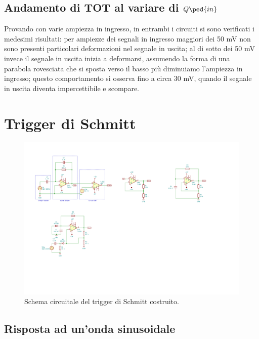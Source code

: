 \documentclass[10pt,a4paper]{article}
\begin{document}

\subsection{Andamento di TOT al variare di $Q\ped{in}$}

Provando con varie ampiezza in ingresso, in entrambi i circuiti si sono verificati i medesimi risultati: per ampiezze dei segnali in ingresso maggiori dei 50 mV non sono presenti particolari deformazioni nel segnale in uscita; al di sotto dei 50 mV invece il segnale in uscita inizia a deformarsi, assumendo la forma di una parabola rovesciata che si sposta verso il basso più diminuiamo l'ampiezza in ingresso; questo comportamento si osserva fino a circa 30 mV, quando il segnale in uscita diventa impercettibile e scompare.

\section{Trigger di Schmitt}

\begin{figure}[htbp]
    \centering
	\includegraphics[scale=1.5]{trgSchmitt}
    \caption{Schema circuitale del trigger di Schmitt costruito.
    \label{fig: trgschmittschm}}
\end{figure}

\subsection{Risposta ad un'onda sinusoidale}
\end{document}
